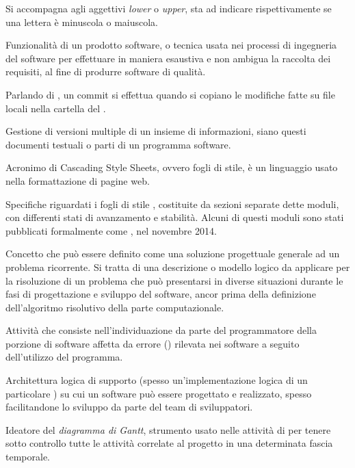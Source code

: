 Si accompagna agli aggettivi \textit{lower} o \textit{upper}, sta ad indicare rispettivamente se una lettera è minuscola o maiuscola.

Funzionalità di un prodotto software, o tecnica usata nei processi di ingegneria del software per effettuare in maniera esaustiva e non ambigua la raccolta dei requisiti, al fine di produrre software di qualità.

Parlando di , un commit si effettua quando si copiano le modifiche fatte su file locali nella cartella del .

Gestione di versioni multiple di un insieme di informazioni, siano questi documenti testuali o parti di un programma software.

Acronimo di Cascading Style Sheets, ovvero fogli di stile, \`e un linguaggio usato nella formattazione di pagine web.

Specifiche riguardati i fogli di stile , costituite da sezioni separate dette moduli, con differenti stati di avanzamento e stabilit\`a. Alcuni di questi moduli sono stati pubblicati formalmente come , nel novembre 2014.
\clearpage

Concetto che può essere definito come una soluzione progettuale generale ad un problema ricorrente. Si tratta di una descrizione o modello logico da applicare per la risoluzione di un problema che può presentarsi in diverse situazioni durante le fasi di progettazione e sviluppo del software, ancor prima della definizione dell'algoritmo risolutivo della parte computazionale.

Attività che consiste nell'individuazione da parte del programmatore della porzione di software affetta da errore () rilevata nei software a seguito dell'utilizzo del programma.
\clearpage

Architettura logica di supporto (spesso un'implementazione logica di un particolare ) su cui un software può essere progettato e realizzato, spesso facilitandone lo sviluppo da parte del team di sviluppatori.
\clearpage

Ideatore del \textit{diagramma di Gantt}, strumento usato nelle attività di  per tenere sotto controllo tutte le attività correlate al progetto in una determinata fascia temporale.

